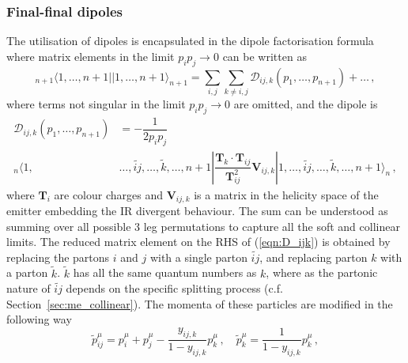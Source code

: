 \documentclass[main.tex]{subfiles}
\begin{document}
    \subsubsection{Final-final dipoles}
        The utilisation of dipoles is encapsulated in the
        dipole factorisation formula where matrix elements in the limit
        $p_{i}p_{j} \rightarrow 0$ can be written as
        \begin{equation}\label{eqn:FF_factorisation}
            {}_{n+1} \langle 1, \ldots, n+1 | | 1, \ldots, n+1 \rangle_{n+1} = \sum_{i,j}\sum_{k\neq i,j}\mathcal{D}_{ij,k}(p_{1},\ldots,p_{n+1}) + \ldots \, ,
        \end{equation}
        where terms not singular in the limit $p_{i}p_{j} \rightarrow 0$
        are omitted, and the dipole is
        \begin{equation}\label{eqn:D_ijk}
            \begin{split}
                \mathcal{D}_{ij,k}(p_{1},\ldots,p_{n+1}) &= -\dfrac{1}{2p_{i}p_{j}} \\
                {}_{n}\langle 1, &\ldots, \widetilde{ij}, \ldots, \tilde{k}, \ldots, n+1 | \dfrac{\boldsymbol{T}_{k} \cdot \boldsymbol{T}_{ij}}{\boldsymbol{T}_{ij}^{2}} \boldsymbol{V}_{ij,k} | 1, \ldots, \widetilde{ij}, \ldots, \tilde{k}, \ldots, n+1 \rangle_{n} \, ,
            \end{split}
        \end{equation}
        where $\boldsymbol{T}_{i}$ are colour charges and $\boldsymbol{V}_{ij,k}$
        is a matrix in the helicity space of the emitter embedding the
        IR divergent behaviour.
        The sum can be understood as summing over all possible
        3 leg permutations to capture all the soft and collinear limits.
        The reduced matrix element on the RHS of (\ref{eqn:D_ijk})
        is obtained by replacing the partons $i$ and $j$ with
        a single parton $\widetilde{ij}$, and replacing parton
        $k$ with a parton $\tilde{k}$. $\tilde{k}$ has all the
        same quantum numbers as $k$, where as the
        partonic nature of $\widetilde{ij}$ depends on
        the specific splitting process (c.f. Section~\ref{sec:me_collinear}).
        The momenta of these particles are modified in the following way
        \begin{equation}\label{eqn:FF_mapping}
            \tilde{p}_{ij}^{\mu} = p_{i}^{\mu} + p_{j}^{\mu} - \dfrac{y_{ij,k}}{1-y_{ij,k}} p_{k}^{\mu} \, , \quad \tilde{p}_{k}^{\mu} = \dfrac{1}{1-y_{ij,k}}p_{k}^{\mu} \, ,
        \end{equation}
\end{document}
